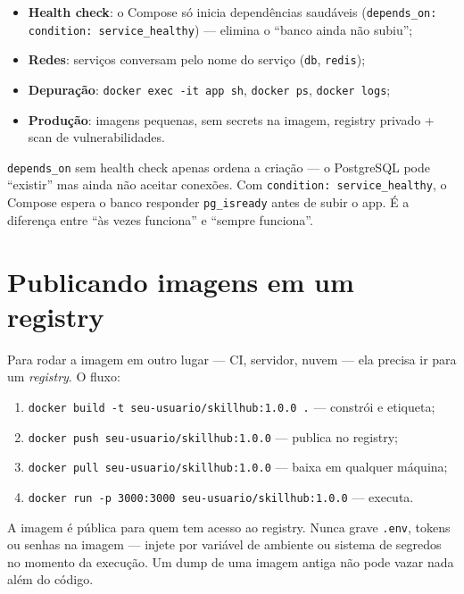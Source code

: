 \begin{itemize}[leftmargin=*, itemsep=0.4em]
  \item \textbf{Health check}: o Compose só inicia dependências saudáveis (\texttt{depends\_on: condition: service\_healthy}) — elimina o ``banco ainda não subiu'';
  \item \textbf{Redes}: serviços conversam pelo nome do serviço (\texttt{db}, \texttt{redis});
  \item \textbf{Depuração}: \texttt{docker exec -it app sh}, \texttt{docker ps}, \texttt{docker logs};
  \item \textbf{Produção}: imagens pequenas, sem secrets na imagem, registry privado + scan de vulnerabilidades.
\end{itemize}

\begin{caixadica}
\texttt{depends\_on} sem health check apenas ordena a criação — o PostgreSQL
pode ``existir'' mas ainda não aceitar conexões. Com
\texttt{condition: service\_healthy}, o Compose espera o banco responder
\texttt{pg\_isready} antes de subir o app. É a diferença entre ``às vezes
funciona'' e ``sempre funciona''.
\end{caixadica}

\section{Publicando imagens em um registry}

Para rodar a imagem em outro lugar — CI, servidor, nuvem — ela precisa ir para
um \emph{registry}. O fluxo:

\begin{enumerate}[leftmargin=*, itemsep=0.4em]
  \item \texttt{docker build -t seu-usuario/skillhub:1.0.0 .} — constrói e etiqueta;
  \item \texttt{docker push seu-usuario/skillhub:1.0.0} — publica no registry;
  \item \texttt{docker pull seu-usuario/skillhub:1.0.0} — baixa em qualquer máquina;
  \item \texttt{docker run -p 3000:3000 seu-usuario/skillhub:1.0.0} — executa.
\end{enumerate}

\begin{caixaarmadilha}
A imagem é pública para quem tem acesso ao registry. Nunca grave
\texttt{.env}, tokens ou senhas na imagem — injete por variável de ambiente ou
sistema de segredos no momento da execução. Um dump de uma imagem antiga não
pode vazar nada além do código.
\end{caixaarmadilha}

